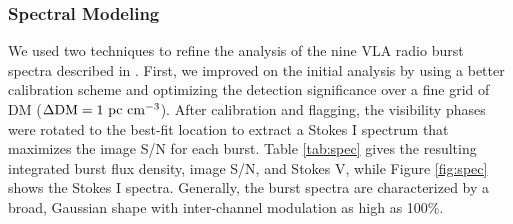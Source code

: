 \documentclass[twocolumn]{aastex61}
\begin{document}
\subsubsection{Spectral Modeling}
\label{sec:spec}
We used two techniques to refine the analysis of the nine VLA radio burst spectra described in \citet{LOC}. First, we improved on the initial analysis by using a better calibration scheme and optimizing the detection significance over a fine grid of DM ($\Delta \rm{DM}=1\ \rm{pc}\ \rm{cm}^{-3}$). After calibration and flagging, the visibility phases were rotated to the best-fit location \citep[(RA, Dec) $=$ (05h31m58.70s, +33d08m52.5s);][]{LOC} to extract a Stokes I spectrum that maximizes the image S/N for each burst. Table \ref{tab:spec} gives the resulting integrated burst flux density, image S/N, and Stokes V, while Figure \ref{fig:spec} shows the Stokes I spectra. Generally, the burst spectra are characterized by a broad, Gaussian shape with inter-channel modulation as high as 100\%.
\end{document}
